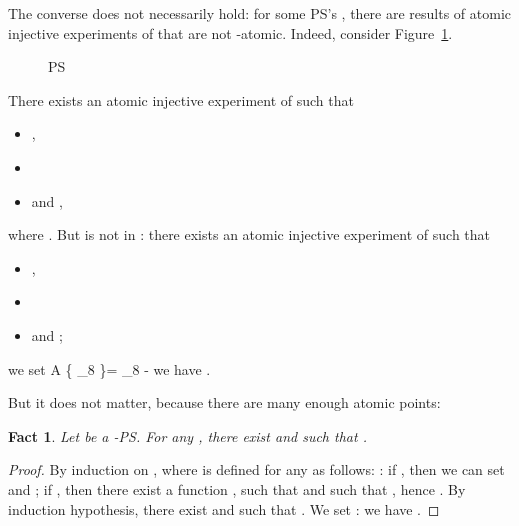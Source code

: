 \documentclass{article}
\theoremstyle{plain}
\newtheorem{fact}[theorem]{Fact}
\newcommand{\scalefactfour}{0.7}
\newcommand{\pictfour}[1]{\scalebox{\scalefactfour}{}}
\begin{document}
The converse does not necessarily hold: for some PS's , there are results of atomic injective experiments of  that are not -atomic. Indeed, consider Figure~\ref{fig: atomic experiments}. 
\begin{figure}[!t]
\centering
\pictfour{atomic}
\caption{PS }
\label{fig: atomic experiments}
\end{figure}
There exists an atomic injective experiment  of  such that 
\begin{itemize}
\item , 
\item 
\item and ,
\end{itemize}
where . But  is not in : there exists an atomic injective experiment  of  such that 
\begin{itemize}
\item , 
\item  
\item and ;
\end{itemize}
we set \gamma \in A \setminus \{ \gamma_8 \}\gamma = \gamma_8 - we have .

But it does not matter, because there are many enough atomic points:

\begin{fact}\label{fact: atomic are enough}
Let  be a -PS. For any , there exist  and  such that . \end{fact}

\begin{proof}
By induction on , where  is defined for any  as follows: : if , then we can set  and ; if , then there exist a function ,  such that  and  such that , hence . By induction hypothesis, there exist  and  such that . We set : we have .
\end{proof}
\end{document}
